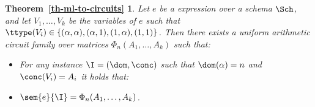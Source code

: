 \newtheorem*{LANGINCIRC}{Theorem~\ref{th-ml-to-circuits}}

\begin{LANGINCIRC}
  Let $e$ be a \langfor expression over a schema $\Sch$, and let $V_1,\ldots ,V_k$ be the variables of $e$ such that $\ttype(V_i)\in \{(\alpha,\alpha), (\alpha,1), (1,\alpha), (1,1)\}$. Then there exists a uniform arithmetic circuit family over matrices $\Phi_n(A_1,\ldots ,A_k)$ such that:
  \begin{itemize}
  \item For any instance $\I = (\dom,\conc)$ such that $\dom(\alpha) = n$ and $\conc(V_i) = A_i$ it holds that:
  \item $\sem{e}{\I} = \Phi_n(A_1,\ldots ,A_k)$.
  \end{itemize}
\end{LANGINCIRC}


